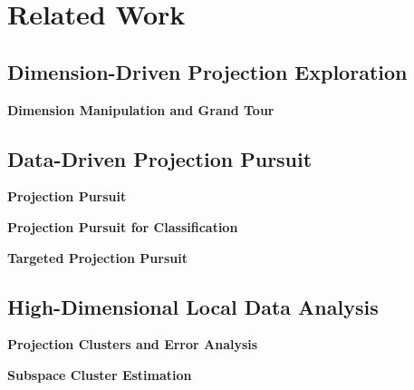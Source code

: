 \section{Related Work}

\subsection{Dimension-Driven Projection Exploration}
\textbf{Dimension Manipulation and Grand Tour}
~\cite{DBLP:journals/tvcg/NamM13}~\cite{DBLP:journals/tvcg/LehmannT13}~\cite{DBLP:journals/cgf/JeongZFRC09}

\subsection{Data-Driven Projection Pursuit}
\textbf{Projection Pursuit}
~\cite{DBLP:journals/tc/FriedmanT74}~\cite{cook1995grand}~\cite{DBLP:journals/ivs/SeoS05}~\cite{DBLP:journals/tvcg/JohanssonJ09}~\cite{DBLP:conf/apvis/NhonW14}

\textbf{Projection Pursuit for Classification}
~\cite{DBLP:journals/cgf/SipsNLH09}~\cite{DBLP:conf/ieeevast/ChooLKP10}

\textbf{Targeted Projection Pursuit}
~\cite{DBLP:journals/tvcg/JoiaCCPN11}~\cite{DBLP:conf/ieeevast/BrownLBC12}~\cite{DBLP:journals/tvcg/Gleicher13}~\cite{DBLP:journals/tvcg/HuBMHNL13}

\subsection{High-Dimensional Local Data Analysis}
\textbf{Projection Clusters and Error Analysis}
~\cite{DBLP:conf/ieeevast/Kandogan12}~\cite{DBLP:journals/cg/MartinsCMT14}~\cite{DBLP:journals/tvcg/StahnkeDMT16}

\textbf{Subspace Cluster Estimation}
~\cite{DBLP:journals/tsp/CarterRH10}~\cite{DBLP:journals/tvcg/YuanRWG13}~\cite{DBLP:journals/cgf/LiuWTBP15}